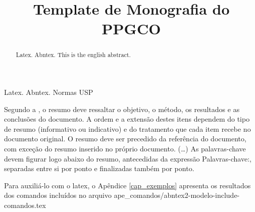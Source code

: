 \documentclass[dissertmst]{ppgco}
\title{Template de Monografia do PPGCO}
\begin{document}
\pretextual

\maketitle






\begin{resumo}{Latex. Abntex. Normas USP}

 	 Segundo a , o resumo deve ressaltar o  objetivo, o método, os resultados e as conclusões do documento. A ordem e a extensão  destes itens dependem do tipo de resumo (informativo ou indicativo) e do  tratamento que cada item recebe no documento original. O resumo deve ser  precedido da referência do documento, com exceção do resumo inserido no  próprio documento. (\ldots) As palavras-chave devem figurar logo abaixo do  resumo, antecedidas da expressão Palavras-chave:, separadas entre si por  ponto e finalizadas também por ponto.
     
    Para auxiliá-lo com o latex, o Apêndice 
  \ref{cap_exemplos} apresenta os resultados dos comandos incluídos no arquivo ape\_comandos/abntex2-modelo-include-comandos.tex 

\end{resumo}

\begin{abstract}{Latex. Abntex.}
This is the english abstract.
	
\end{abstract}
\end{document}
